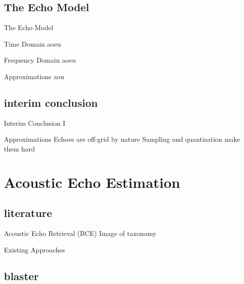 \documentclass[9pt,dvipsnames]{beamer}
\renewenvironment{block}[1]{\begin{oldblock}{#1}\smallskip}{\end{oldblock}}
\begin{document}
\subsection{The Echo Model}
\begin{frame}{The Echo Model}
    \begin{block}{Time Domain}
        aoeu
    \end{block}
    
    \begin{block}{Frequency Domain}
        aoeu
    \end{block}
    
    \begin{block}{Approximations}
        aou    
    \end{block}
    
\end{frame}

\subsection*{interim conclusion}
\begin{frame}{Interim Conclusion I}
    \begin{alertblock}{Approximations}
        Echoes are off-grid by nature
        Sampling and quantization make them hard
    \end{alertblock}
\end{frame}

\section{Acoustic Echo Estimation}

\subsection{literature}

\begin{frame}{Acoustic Echo Retrieval (BCE)}
    Image of taxonomy

    \begin{block}{Existing Approaches}
        
    \end{block}
    
\end{frame}

\subsection{blaster}
\end{document}
